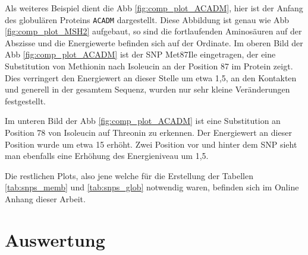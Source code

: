 Als weiteres Beispiel dient die \ac{Abb} \ref{fig:comp_plot_ACADM}, hier ist der Anfang des globulären Proteins \texttt{ACADM} dargestellt. Diese Abbildung ist genau wie \ac{Abb} \ref{fig:comp_plot_MSH2} aufgebaut, so sind die fortlaufenden Aminosäuren auf der Abszisse und die Energiewerte befinden sich auf der Ordinate. Im oberen Bild der \ac{Abb} \ref{fig:comp_plot_ACADM} ist der \ac{SNP} Met87Ile eingetragen, der eine Substitution von Methionin nach Isoleucin an der Position 87 im Protein zeigt. Dies verringert den Energiewert an dieser Stelle um etwa 1,5, an den Kontakten und generell in der gesamtem Sequenz, wurden nur sehr kleine Veränderungen festgestellt.

Im unteren Bild der \ac{Abb} \ref{fig:comp_plot_ACADM} ist eine Substitution an Position 78 von Isoleucin auf Threonin zu erkennen. Der Energiewert an dieser Position wurde um etwa 15 erhöht. Zwei Position vor und hinter dem \ac{SNP} sieht man ebenfalls eine Erhöhung des Energieniveau um 1,5.

Die restlichen Plots, also jene welche für die Erstellung der Tabellen \ref{tab:snps_memb} und \ref{tab:snps_glob} notwendig waren, befinden sich im Online Anhang dieser Arbeit.

\newpage
\section{Auswertung}
\label{sec:snp_auswertung}

